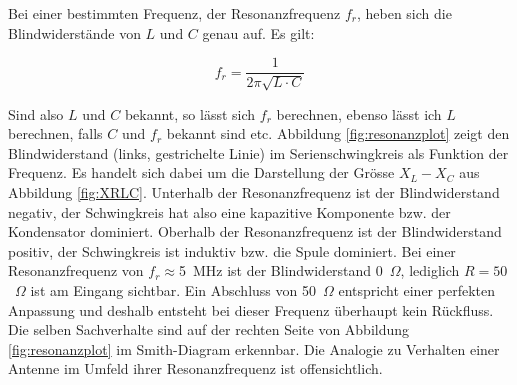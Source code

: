 \documentclass[twoside,a4paper,11pt,halfparskip,DIV=11,notitlepage]{scrartcl}
\begin{document}
Bei einer bestimmten Frequenz, der Resonanzfrequenz $f_r$, heben sich die
Blindwiderstände von $L$ und $C$ genau auf. Es gilt:

$$
f_r = \frac{1}{2\pi\sqrt{L\cdot C}}
$$

Sind also $L$ und $C$ bekannt, so lässt sich $f_r$ berechnen, ebenso lässt ich
$L$ berechnen, falls $C$ und $f_r$ bekannt sind etc. Abbildung \ref{fig:resonanzplot}
zeigt den Blindwiderstand (links, gestrichelte Linie) im Serienschwingkreis als Funktion der Frequenz. Es
handelt sich dabei um die Darstellung der Grösse $X_L-X_C$ aus Abbildung \ref{fig:XRLC}.
Unterhalb der Resonanzfrequenz ist der Blindwiderstand negativ, der
Schwingkreis hat also eine kapazitive Komponente bzw. der Kondensator
dominiert. Oberhalb der Resonanzfrequenz ist der Blindwiderstand positiv, der
Schwingkreis ist induktiv bzw. die Spule dominiert. Bei einer Resonanzfrequenz
von $f_r\approx$5~MHz ist der Blindwiderstand 0~$\Omega$, lediglich $R=50$~$\Omega$
ist am Eingang sichtbar. Ein Abschluss von 50~$\Omega$ entspricht einer perfekten
Anpassung und deshalb entsteht bei dieser Frequenz überhaupt kein Rückfluss.
Die selben Sachverhalte sind auf der rechten Seite von Abbildung
\ref{fig:resonanzplot} im Smith-Diagram erkennbar. Die Analogie zu Verhalten
einer Antenne im Umfeld ihrer Resonanzfrequenz ist offensichtlich.
\end{document}
